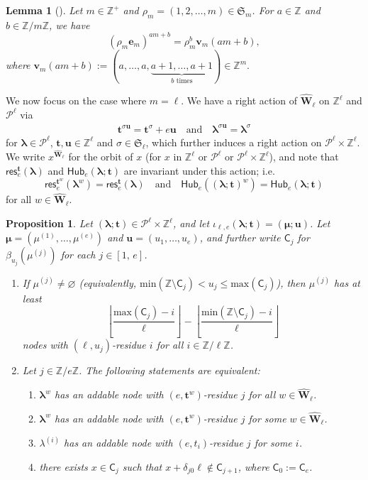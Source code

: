\documentclass[11pt,a4paper,reqno]{amsart}
\numberwithin{equation}{section}
\theoremstyle{plain}
\newtheorem{lem}[thm]{Lemma}
\newtheorem{prop}[thm]{Proposition}
\theoremstyle{definition}
\theoremstyle{remark}
\numberwithin{equation}{section}
\newcommand{\bl}{\boldsymbol{\lambda}}
\newcommand{\bm}{\boldsymbol{\mu}}
\newcommand{\bt}{\mathbf{t}}
\newcommand{\bu}{\mathbf{u}}
\newcommand{\bv}{\mathbf{v}}
\newcommand{\mv}{\mathbf{mv}}
\renewcommand{\min}{\mathrm{min}}
\renewcommand{\max}{\mathrm{max}}
\newcommand{\ZZ}{\mathbb{Z}}
\newcommand{\C}{\mathsf{C}}
\newcommand{\rr}{\rho}
\newcommand{\Hub}{\mathsf{Hub}}
\newcommand{\PP}{\mathcal{P}}
\newcommand{\res}{\mathsf{res}}
\newcommand{\Be}{\mathbf{e}}
\newcommand{\EW}{\widehat{\mathbf{W}}}
\newcommand{\sym}[1]{\mathfrak{S}_{#1}}
\newcommand{\bij}{\iota}
\def\Z{{\mathbb Z}}
\begin{document}
\begin{lem}[{\cite[Lemma 2.7(1)]{LQT}}] \label{L:AA}
Let $m \in \ZZ^+$ and $\rr_{m} = (1,2,\dotsc, m) \in \sym{m}$.
For $a \in \ZZ$ and $b \in \ZZ/m\ZZ$, we have
$$(\rr_{m}\Be_{m})^{am + b} = \rr_{m}^b \bv_{m}(am + b),$$ where 
$
\bv_{m}(am+b) := (a,\dotsc, a, \underbrace{a+1,\dotsc, a+1}_{b \text{ times}}) \in \ZZ^{m}.
$
\end{lem}



We now focus on the case where $m = \ell$.
We have a right action of $\EW_{\ell}$ on $\Z^{\ell}$ and $\PP^{\ell}$  via
\begin{align*}
\bt^{\sigma \bu} = \bt^{\sigma} + e\bu \quad \text {and} \quad
\bl^{\sigma \bu} = \bl^{\sigma}
\end{align*}
for $\bl \in \PP^{\ell}$, $\bt, \bu \in \Z^{\ell}$ and $\sigma \in \sym{\ell}$, which further induces a right action on $\PP^{\ell}\times \Z^{\ell}$.
We write $x^{\EW_{\ell}}$ for the orbit of $x$ (for $x$ in $\Z^{\ell}$ or $\PP^{\ell}$ or $\PP^{\ell}\times \Z^{\ell}$), and note that $\res^{\bt}_e(\bl)$ and $\Hub_e(\bl;\bt)$ are invariant under this action; i.e.\
\begin{equation*}
\res^{\bt^w}_e(\bl^w) = \res^{\bt}_e(\bl) \quad \text{and} \quad \Hub_e((\bl;\bt)^w) = \Hub_e(\bl;\bt) \label{E:res-hub}
\end{equation*}
for all $w \in \EW_{\ell}$.

\begin{prop} \label{P:abacus}
Let $(\bl;\bt) \in \PP^{\ell} \times \ZZ^{\ell}$, %
and let $\bij_{\ell,e}(\bl;\bt) = (\bm;\bu)$. %
Let $\bm = (\mu^{(1)},\dotsc, \mu^{(e)})$ and $\bu = (u_1,\dotsc, u_e)$, and further write $\C_j$ for $\beta_{u_j}(\mu^{(j)})$ for each $j \in [1,\,e]$.
\begin{enumerate}
\item 
If $\mu^{(j)} \ne \varnothing$ (equivalently, $\min(\ZZ \setminus \C_j) < u_j \leq \max(\C_j)$), then $\mu^{(j)}$ has at least
$$
\left\lfloor \frac{\max(\C_j) -i}{\ell} \right\rfloor  - \left\lfloor \frac{\min(\ZZ \setminus \C_j) -i}{\ell} \right\rfloor
$$
nodes with $(\ell,u_j)$-residue $i$
for all $i \in \ZZ/\ell\ZZ$.

\item Let $j \in \ZZ/e\ZZ$.  The following statements are equivalent:
\begin{enumerate}
\item 
$\bl^{w}$ has an addable node with $(e,\bt^w)$-residue $j$ for all $w \in \EW_{\ell}$.
\item $\bl^w$ has an addable node with $(e,\bt^w)$-residue $j$ for some $w \in \EW_{\ell}$.
\item $\lambda^{(i)}$ has an addable node with $(e,t_i)$-residue $j$ for some $i$.
\item there exists $x \in \C_j$ such that $x + \delta_{j0} \ell \notin \C_{j+1}$, where $\C_{0} := \C_e$.
\end{enumerate}
\end{enumerate}
\end{prop}
\end{document}
